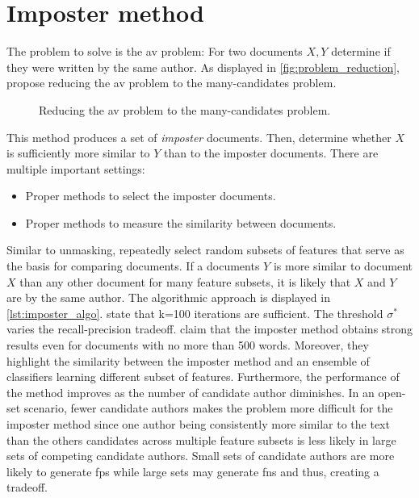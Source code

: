 \section{Imposter method}
\label{sec:imposter_method}

The problem to solve is the \ac{av} problem:
For two documents $X, Y$ determine if they were written by the same author.
As displayed in \autoref{fig:problem_reduction}, \citet{koppel_determining_2014} propose reducing the \ac{av} problem to the many-candidates problem.

\begin{figure}[htbp]
    \centering
    
    \caption{Reducing the \ac{av} problem to the many-candidates problem.}
    \label{fig:problem_reduction}
\end{figure}

This method produces a set of \textit{imposter} documents.
Then, \citet{koppel_determining_2014} determine whether $X$ is sufficiently more similar to $Y$ than to the imposter documents.
There are multiple important settings:
\begin{itemize}
    \item Proper methods to select the imposter documents.
    \item Proper methods to measure the similarity between documents.
\end{itemize}
Similar to unmasking, \citet{koppel_determining_2014} repeatedly select random subsets of features that serve as the basis for comparing documents.
If a documents $Y$ is more similar to document $X$ than any other document for many feature subsets, 
it is likely that $X$ and $Y$ are by the same author.
The algorithmic approach is displayed in \autoref{lst:imposter_algo}.
\citet{koppel_determining_2014} state that k=100 iterations are sufficient.
The threshold $\sigma^*$ varies the recall-precision tradeoff.
\citet{koppel_determining_2014} claim that the imposter method obtains strong results even for documents with no more than 500 words.
Moreover, they highlight the similarity between the imposter method and an ensemble of classifiers learning different subset of features.
Furthermore, the performance of the method improves as the number of candidate author diminishes.
In an open-set scenario, fewer candidate authors makes the problem more difficult for the imposter method 
since one author being consistently more similar to the text than the others candidates across multiple feature subsets is less likely in large sets of competing candidate authors.
Small sets of candidate authors are more likely to generate \acp{fp} 
while large sets may generate \acp{fn} and thus, creating a tradeoff.

